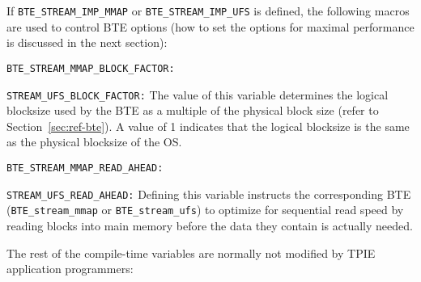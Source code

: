 \noindent
If \lstinline|BTE_STREAM_IMP_MMAP| or \lstinline|BTE_STREAM_IMP_UFS|
is defined, the following macros are used to control BTE options (how
to set the options for maximal performance is discussed in the next
section):

\begin{description}
  
\item\lstinline|BTE_STREAM_MMAP_BLOCK_FACTOR:|
\item\lstinline|STREAM_UFS_BLOCK_FACTOR:| The value of this
  variable determines the logical blocksize used by the BTE as a
  multiple of the physical block size (refer to
  Section~\ref{sec:ref-bte}). A value of 1 indicates that the logical
  blocksize is the same as the physical blocksize of the OS.

\item\lstinline|BTE_STREAM_MMAP_READ_AHEAD:| 
\item\lstinline|STREAM_UFS_READ_AHEAD:| Defining this variable
  instructs the corresponding BTE (\lstinline|BTE_stream_mmap| or
  \lstinline|BTE_stream_ufs|) to optimize for sequential read speed by
  reading blocks into main memory before the data they contain is
  actually needed.  
 

\end{description}

\noindent
The rest of the compile-time variables are normally not modified by
TPIE application programmers:

